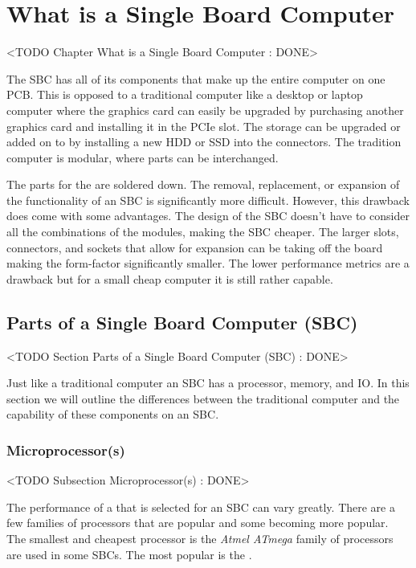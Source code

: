 \chapter{What is a Single Board Computer}
	<TODO Chapter What is a Single Board Computer : DONE>

The \ac{SBC} has all of its components that make up the entire computer on one \ac{PCB}. This is opposed to a traditional computer like a desktop or laptop computer where the graphics card can easily be upgraded by purchasing another graphics card and installing it in the \ac{PCIe} slot. The storage can be upgraded or added on to by installing a new \ac{HDD} or \ac{SSD} into the connectors. The tradition computer is modular, where parts can be interchanged.

The parts for the  are soldered down. The removal, replacement, or expansion of the functionality of an \ac{SBC} is significantly more difficult. However, this drawback does come with some advantages. The design of the \ac{SBC} doesn't have to consider all the combinations of the modules, making the \ac{SBC} cheaper. The larger slots, connectors, and sockets that allow for expansion can be taking off the board making the form-factor significantly smaller. The lower performance metrics are a drawback but for a small cheap computer it is still rather capable.

\section{Parts of a Single Board Computer (SBC)}
	<TODO Section Parts of a Single Board Computer (SBC) : DONE>

Just like a traditional computer an \ac{SBC} has a processor, memory, and \ac{IO}. In this section we will outline the differences between the traditional computer and the capability of these components on an \ac{SBC}.
	
\subsection{Microprocessor(s)}
	<TODO Subsection Microprocessor(s) : DONE>

The performance of a  that is selected for an \ac{SBC} can vary greatly. There are a few families of processors that are popular and some becoming more popular. The smallest and cheapest processor is the \emph{Atmel ATmega} family of processors are used in some \ac{SBC}s. The most popular is the .

